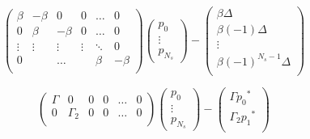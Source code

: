 \documentclass[10pt,a4paper]{article}
\begin{document}
\begin{equation}\label{min_step_dist}
	\begin{pmatrix} 
         \beta    & -\beta 	 	& 0 &0& \hdots & 0 \\
         0&\beta    & -\beta 	 	& 0 & \hdots & 0 \\
         \vdots	 			&\vdots 	& \vdots & \vdots &  \ddots & 0 \\ 
         0       		&  	 		&    \hdots&  & \beta    & -\beta \\
	\end{pmatrix}
	\begin{pmatrix} 
        p_0 \\
        \vdots \\
        p_{N_s}
	\end{pmatrix}- \begin{pmatrix} 
        \beta \Delta\\
        \beta (-1)\Delta\\
        \vdots \\
        \beta(-1)^{N_s-1}\Delta\\
	\end{pmatrix}
\end{equation}





\begin{equation}\label{p0_p1}
	\begin{pmatrix} 
         \Gamma    & 0 	 	& 0 &0& \hdots & 0 \\
         0&\Gamma_2    & 0	 	& 0 & \hdots & 0 \\
        \end{pmatrix}
	\begin{pmatrix} 
        p_0 \\
        \vdots \\
        p_{N_s}
	\end{pmatrix}- \begin{pmatrix} 
        \Gamma     {p_{0}}^*\\
         \Gamma_2  {p_{1}}^*\\
	\end{pmatrix}
\end{equation}
\end{document}
